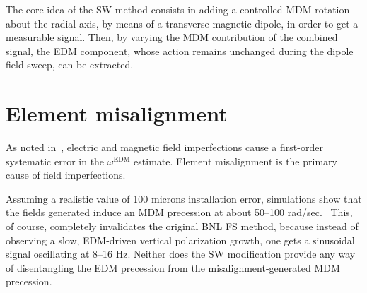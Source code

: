 \documentclass{article}
\newcommand{\w}{\omega}
\newcommand{\EDM}{{}^\mathrm{EDM}}
\begin{document}
The core idea of the SW method consists in adding a controlled MDM rotation about the radial axis, by means of a transverse magnetic dipole, in order to get a measurable signal. Then, by varying the MDM contribution of the combined signal, the EDM component, whose action remains unchanged during the dipole field sweep, can be extracted.

\section{Element misalignment}
As noted in~\cite[p. 24]{BNL_proposal}, electric and magnetic field imperfections cause a first-order systematic error in the $\w\EDM$ estimate. Element misalignment is the primary cause of field imperfections.

Assuming a realistic value of 100 microns installation error, simulations show that the fields generated induce an MDM precession at about 50--100 rad/sec.~\cite{Senichev:FDM} This, of course, completely invalidates the original BNL FS method, because instead of observing a slow, EDM-driven vertical polarization growth, one gets a sinusoidal signal oscillating at 8--16 Hz. Neither does the SW modification provide any way of disentangling the EDM precession from the misalignment-generated MDM precession.


\end{document}
